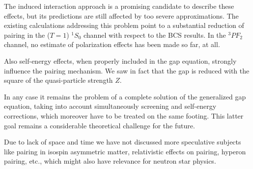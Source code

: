 \documentclass[runningheads]{svmult}
\def\pf{^3\!P\!F_2}
\def\ss{^1\!S_0}
\begin{document}
The induced interaction approach is a promising candidate to describe these 
effects, but its predictions are still affected by too severe approximations. 
The existing calculations addressing this problem point to a substantial
reduction of pairing in the ($T=1$) $\ss$ channel with respect to the BCS
results.
In the $\pf$ channel, no estimate of polarization effects has been made so
far, at all.

Also self-energy effects, when properly included in the gap equation,  
strongly influence the pairing mechanism. 
We saw in fact that the gap is reduced with the square of the 
quasi-particle strength $Z$.    

In any case it remains the problem of a complete solution of the generalized
gap equation, taking into account simultaneously screening and self-energy
corrections, which moreover have to be treated on the same footing.
This latter goal remains a considerable theoretical challenge for the future.

Due to lack of space and time we have not discussed more speculative 
subjects like 
pairing in isospin asymmetric matter,
relativistic effects on pairing, 
hyperon pairing, etc., 
which might also have relevance for neutron star physics.


\end{document}
